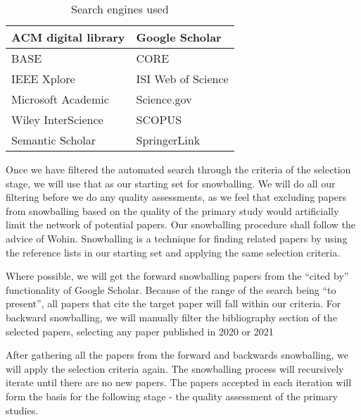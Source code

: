 \begin{table}[H]
    \begin{center}         
        \begin{tabular}{|l||l|}
            \hline
            ACM digital library       & Google Scholar       \\
            \hline
            BASE                      & CORE                 \\
            \hline  
            IEEE Xplore               & ISI Web of Science   \\
            \hline  
            Microsoft Academic        & Science.gov          \\
            \hline  
            Wiley InterScience        & SCOPUS               \\
            \hline  
            Semantic Scholar          & SpringerLink         \\
            \hline  
        \end{tabular}
    \end{center}
    \caption{Search engines used}
    \label{table:searchEngines}
\end{table}

Once we have filtered the automated search through the criteria of the selection stage, we will use that as our starting set for snowballing.
We will do all our filtering before we do any quality assessments, as we feel that excluding papers from snowballing based on the quality of the primary study would artificially limit the network of potential papers.
Our snowballing procedure shall follow the advice of Wohin\cite{Wohlin_2014}.
Snowballing is a technique for finding related papers by using the reference lists in our starting set and applying the same selection criteria.

Where possible, we will get the forward snowballing papers from the ``cited by'' functionality of Google Scholar.
Because of the range of the search being ``to present'', all papers that cite the target paper will fall within our criteria.
For backward snowballing, we will manually filter the bibliography section of the selected papers, selecting any paper published in 2020 or 2021

After gathering all the papers from the forward and backwards snowballing, we will apply the selection criteria again.
The snowballing process will recursively iterate until there are no new papers.
The papers accepted in each iteration will form the basis for the following stage - the quality assessment of the primary studies.

